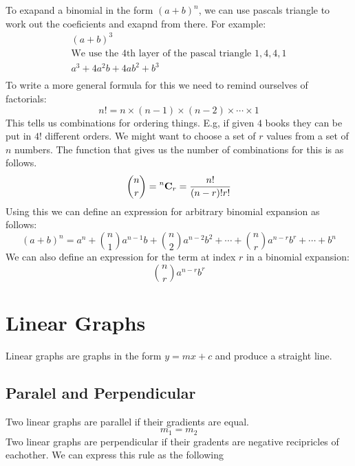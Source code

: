 \documentclass{article}
\begin{document}
To exapand a binomial in the form $(a + b)^n$, we can use pascals triangle to work out the coeficients and exapnd from there.
For example:
\begin{gather*}
	(a + b)^3 \\
	\text{We use the 4th layer of the pascal triangle $1, 4, 4, 1$} \\
	a^3 + 4a^2b + 4ab^2 + b^3 \\
\end{gather*}
To write a more general formula for this we need to remind ourselves of factorials:
\begin{equation}
	n! = n \times (n - 1) \times (n - 2) \times \cdots \times 1
\end{equation}
This tells us combinations for ordering things. E.g, if given $4$ books they can be put in $4!$ different
orders. We might want to choose a set of $r$ values from a set of $n$ numbers. The function that gives us the number of
combinations for this is as follows.
\begin{equation}
	\binom{n}{r} = \prescript{n}{}{\mathbf{C}_r} = \frac{n!}{(n - r)!r!}
\end{equation}
Using this we can define an expression for arbitrary binomial expansion as follows:
\begin{equation}
	(a + b)^n = a^n + \binom{n}{1}a^{n - 1}b + \binom{n}{2}a^{n - 2}b^{2} + \cdots + \binom{n}{r}a^{n - r}b^{r} + \cdots + b^n
\end{equation}
We can also define an expression for the term at index $r$ in a binomial expansion:
\begin{equation}
	\binom{n}{r}a^{n - r}b^{r}
\end{equation}

\section{Linear Graphs}
Linear graphs are graphs in the form $y = mx + c$ and produce a straight line.

\subsection{Paralel and Perpendicular}
Two linear graphs are parallel if their gradients are equal.
\begin{equation}
	m_1 = m_2
\end{equation}
Two linear graphs are perpendicular if their gradents are negative recipricles of eachother. We can express this rule as the following
\end{document}
